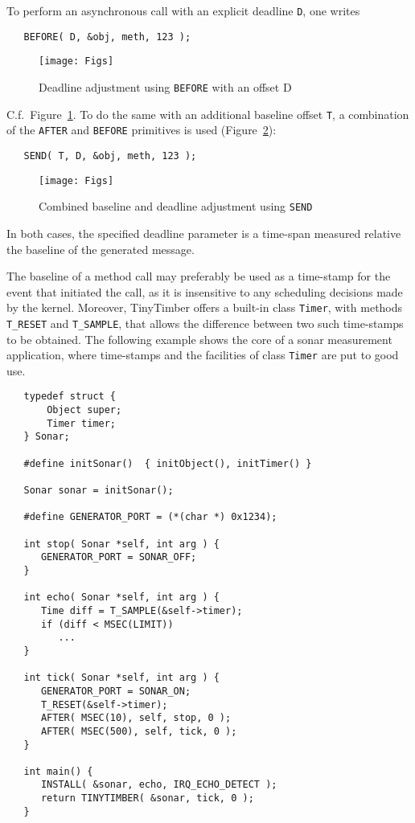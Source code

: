 \documentclass[12pt]{article}
\begin{document}
To perform an asynchronous call with an explicit deadline {\tt D}, one writes
\begin{verbatim}
   BEFORE( D, &obj, meth, 123 );
\end{verbatim}
\begin{figure}
\texttt{[image: Figs]}
\caption{\label{fig:before}Deadline adjustment using {\tt BEFORE} with an offset D}
\end{figure}
C.f.\ Figure~\ref{fig:before}. To do the same with an additional baseline offset {\tt T}, a combination of the {\tt AFTER} and {\tt BEFORE} primitives is used (Figure~\ref{fig:send}):
\begin{verbatim}
   SEND( T, D, &obj, meth, 123 );
\end{verbatim}
\begin{figure}
\texttt{[image: Figs]}
\caption{\label{fig:send}Combined baseline and deadline adjustment using {\tt SEND}}
\end{figure}
In both cases, the specified deadline parameter is a time-span measured relative the baseline of the generated message.

The baseline of a method call may preferably be used as a time-stamp for the event that initiated the call, as it is insensitive to any scheduling decisions made by the kernel. Moreover, TinyTimber offers a built-in class {\tt Timer}, with methods {\tt T\_RESET} and {\tt T\_SAMPLE}, that allows the difference between two such time-stamps to be obtained. The following example shows the core of a sonar measurement application, where time-stamps and the facilities of class {\tt Timer} are put to good use.
\begin{verbatim}
   typedef struct {
       Object super;
       Timer timer;
   } Sonar;
   
   #define initSonar()  { initObject(), initTimer() }
   
   Sonar sonar = initSonar();
   
   #define GENERATOR_PORT = (*(char *) 0x1234);
   
   int stop( Sonar *self, int arg ) {
      GENERATOR_PORT = SONAR_OFF;
   }
   
   int echo( Sonar *self, int arg ) {
      Time diff = T_SAMPLE(&self->timer);
      if (diff < MSEC(LIMIT))
         ...
   }
   
   int tick( Sonar *self, int arg ) {
      GENERATOR_PORT = SONAR_ON;
      T_RESET(&self->timer);
      AFTER( MSEC(10), self, stop, 0 );
      AFTER( MSEC(500), self, tick, 0 );
   }
   
   int main() {
      INSTALL( &sonar, echo, IRQ_ECHO_DETECT );
      return TINYTIMBER( &sonar, tick, 0 );
   }
\end{verbatim}
\end{document}
